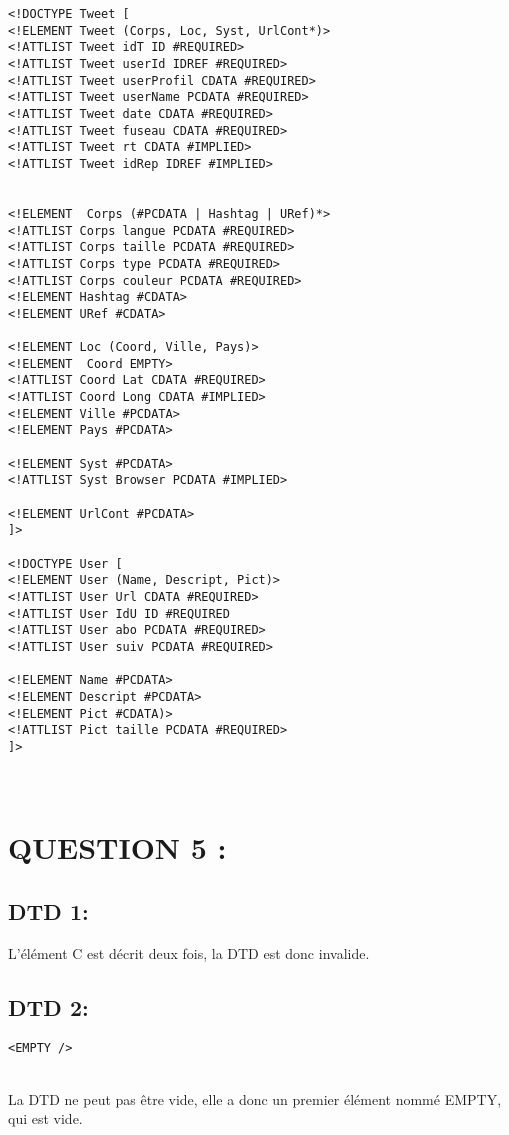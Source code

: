\documentclass[10pt]{article}
\newenvironment{DDbox}[1]{
\begin{lrbox}{\BBbox}\begin{minipage}{\linewidth}}
{\end{minipage}\end{lrbox}\noindent\colorbox{white}{\usebox{\BBbox}} \\
[.5cm]}
\begin{document}
\begin{DDbox}{\linewidth}
\begin{lstlisting}
<!DOCTYPE Tweet [
<!ELEMENT Tweet (Corps, Loc, Syst, UrlCont*)>
<!ATTLIST Tweet idT ID #REQUIRED>
<!ATTLIST Tweet userId IDREF #REQUIRED>
<!ATTLIST Tweet userProfil CDATA #REQUIRED>
<!ATTLIST Tweet userName PCDATA #REQUIRED>
<!ATTLIST Tweet date CDATA #REQUIRED>
<!ATTLIST Tweet fuseau CDATA #REQUIRED>
<!ATTLIST Tweet rt CDATA #IMPLIED>
<!ATTLIST Tweet idRep IDREF #IMPLIED>


<!ELEMENT  Corps (#PCDATA | Hashtag | URef)*>
<!ATTLIST Corps langue PCDATA #REQUIRED>
<!ATTLIST Corps taille PCDATA #REQUIRED>
<!ATTLIST Corps type PCDATA #REQUIRED>
<!ATTLIST Corps couleur PCDATA #REQUIRED>
<!ELEMENT Hashtag #CDATA>
<!ELEMENT URef #CDATA>

<!ELEMENT Loc (Coord, Ville, Pays)>
<!ELEMENT  Coord EMPTY>
<!ATTLIST Coord Lat CDATA #REQUIRED>
<!ATTLIST Coord Long CDATA #IMPLIED>
<!ELEMENT Ville #PCDATA>
<!ELEMENT Pays #PCDATA>

<!ELEMENT Syst #PCDATA>
<!ATTLIST Syst Browser PCDATA #IMPLIED>

<!ELEMENT UrlCont #PCDATA>
]>

<!DOCTYPE User [
<!ELEMENT User (Name, Descript, Pict)>
<!ATTLIST User Url CDATA #REQUIRED>
<!ATTLIST User IdU ID #REQUIRED
<!ATTLIST User abo PCDATA #REQUIRED>
<!ATTLIST User suiv PCDATA #REQUIRED>

<!ELEMENT Name #PCDATA>
<!ELEMENT Descript #PCDATA>
<!ELEMENT Pict #CDATA)>
<!ATTLIST Pict taille PCDATA #REQUIRED>
]>
\end{lstlisting}
\end{DDbox}

\section{QUESTION 5 :}
\subsection{DTD 1:}
L'élément C est décrit deux fois, la DTD est donc invalide.
\subsection{DTD 2:}
\begin{DDbox}{\linewidth}
\begin{lstlisting}
<EMPTY />
\end{lstlisting}
\end{DDbox}
La DTD ne peut pas être vide, elle a donc un premier élément nommé EMPTY, qui est vide.
\end{document}
